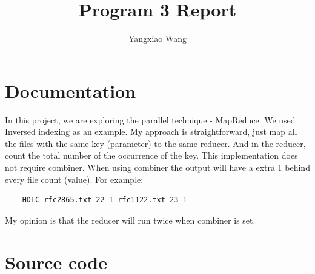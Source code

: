 \documentclass[11pt, letterpaper]{article}
\title{\textbf{Program 3 Report}}
\author{Yangxiao Wang}
\date{ }
\begin{document}
	
	\maketitle
	
	\tableofcontents
	\pagebreak
	
	\section{Documentation}
	In this project, we are exploring the parallel technique - MapReduce. We used Inversed indexing as an example. My approach is straightforward, just map all the files with the same key (parameter) to the same reducer. And in the reducer, count the total number of the occurrence of the key. This implementation does not require combiner. When using combiner the output will have a extra 1 behind every file count (value). For example: 
	\begin{lstlisting}
	HDLC rfc2865.txt 22 1 rfc1122.txt 23 1
	\end{lstlisting}
	My opinion is that the reducer will run twice when combiner is set.
	
	\section {Source code}
\end{document}
